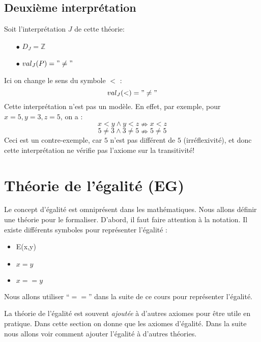 {\subsection*{Deuxième interprétation}
Soit l'interprétation $J$ de cette théorie:
\begin{itemize}
\item[$\bullet$] $D_J = \mathbb{Z} $
\item[$\bullet$] $val_J (P) = "\ne"$
\end{itemize}
Ici on change le sens du symbole $<$ :
$$val_J(<) = "\ne"$$
Cette interprétation n'est pas un modèle. En effet, par exemple, pour $x=5, y=3, z=5$, on a :
$$x<y \wedge y<z \nRightarrow x<z$$
$$5 \neq 3 \wedge 3 \neq 5 \nRightarrow 5 \neq 5$$
Ceci est un contre-exemple, car $5$ n'est pas différent de $5$ (irréflexivité),
et donc cette interprétation ne vérifie pas l'axiome sur la transitivité!



\section{Théorie de l'égalité (EG)}

Le concept d'égalité est omniprésent dans les mathématiques.
Nous allons définir une théorie pour le formaliser.
D'abord, il faut faire attention à la notation.
Il existe différents symboles pour représenter l'égalité : 
\begin{itemize}
	\item E(x,y)
	\item $x = y$
	\item $x == y $
\end{itemize}
Nous allons utiliser ``$==$'' dans la suite de ce cours pour représenter l'égalité.

La théorie de l'égalité est souvent {\em ajoutée} à d'autres axiomes pour être utile en pratique.
Dans cette section on donne que les axiomes d'égalité.  Dans la suite nous allons voir comment
ajouter l'égalité à d'autres théories.

}
